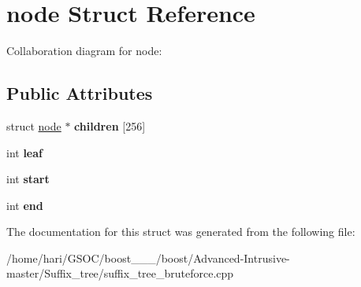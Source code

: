 \hypertarget{structnode}{}\section{node Struct Reference}
\label{structnode}


Collaboration diagram for node\+:
\subsection*{Public Attributes}
\begin{DoxyCompactItemize}
\item 
\mbox{\label{structnode_a7db05ff303f727a214d0baf68e0667ff}} 
struct \hyperlink{structnode}{node} $\ast$ {\bfseries children} \mbox{[}256\mbox{]}
\item 
\mbox{\label{structnode_a5a264428e8e15b47314f13eae5a9e619}} 
int {\bfseries leaf}
\item 
\mbox{\label{structnode_a224812f32f1af1c657f6a49be49ae83e}} 
int {\bfseries start}
\item 
\mbox{\label{structnode_a1f8d26d45bf01fe9152688318f1d7479}} 
int {\bfseries end}
\end{DoxyCompactItemize}


The documentation for this struct was generated from the following file\+:\begin{DoxyCompactItemize}
\item 
/home/hari/\+G\+S\+O\+C/boost\+\_\+\_\+\_/boost/\+Advanced-\/\+Intrusive-\/master/\+Suffix\+\_\+tree/suffix\+\_\+tree\+\_\+bruteforce.\+cpp\end{DoxyCompactItemize}
